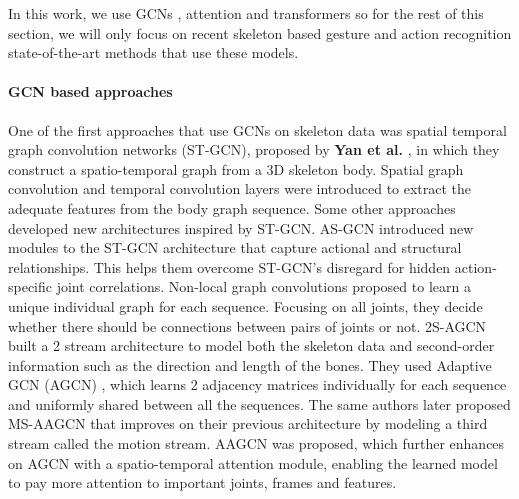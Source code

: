 In this work, we use GCNs \cite{gcn}, attention and transformers \cite{transformer} so for the rest of this section, we will only focus on recent skeleton based gesture and action recognition state-of-the-art methods that use these models.\\
\paragraph{GCN based approaches}
One of the first approaches that use GCNs on skeleton data was spatial temporal graph convolution networks (ST-GCN), proposed by \textbf{Yan et al.} \cite{st-gcn}, in which they construct a spatio-temporal graph from a 3D skeleton body. Spatial graph convolution and temporal convolution layers were introduced to extract the adequate features from the body graph sequence. Some other approaches developed new architectures inspired by ST-GCN. 
AS-GCN \cite{as-gcn} introduced new modules to the ST-GCN architecture that capture actional and structural relationships. This helps them overcome ST-GCN's disregard for hidden action-specific joint correlations.  
Non-local graph convolutions \cite{non-local-gcn} proposed to learn a unique individual graph for each sequence. Focusing on all joints, they decide whether there should be connections between pairs of joints or not. 2S-AGCN \cite{shi2019two} built a 2 stream architecture to model both the skeleton data and second-order information such as the direction and length of the bones. They used Adaptive GCN (AGCN) \cite{li2018adaptive}, which learns 2 adjacency matrices individually for each sequence and uniformly shared between all the sequences. The same authors later proposed MS-AAGCN \cite{shi2020skeleton} that improves on their previous architecture \cite{li2018adaptive} by modeling a third stream called the motion stream. AAGCN was proposed, which further enhances on AGCN with a spatio-temporal attention module, enabling the learned model to pay more attention to important joints, frames and features. \\
